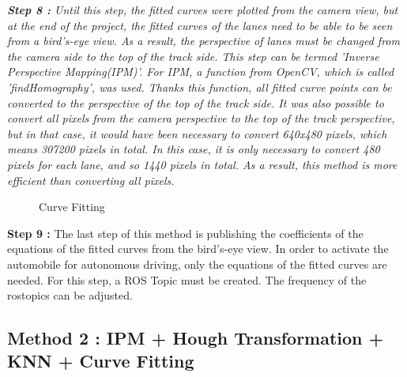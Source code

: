  
\emph{\color{green}\textbf{Step 8 : }Until this step, the fitted curves were plotted from the camera view, but at the end of the project, the fitted curves of the lanes need to be able to be seen from a bird's-eye view. As a result, the perspective of lanes must be changed from the camera side to the top of the track side. This step can be termed 'Inverse Perspective Mapping(IPM)'. For IPM, a function from OpenCV, which is called 'findHomography', was used. Thanks this function, all fitted curve points can be converted to the perspective of the top of the track side. It was also possible to convert all pixels from the camera perspective to the top of the track perspective, but in that case, it would have been necessary to convert 640x480 pixels, which means 307200 pixels in total. In this case, it is only necessary to convert 480 pixels for each lane, and so 1440 pixels in total. As a result, this method is more efficient than converting all pixels.}
 	 		 	
\begin{figure}[H]
  \centering
  \caption{Curve Fitting}
\end{figure} 


\textbf{Step 9 : }The last step of this method is publishing the coefficients of the equations of the fitted curves from the bird's-eye view. In order to activate the automobile for autonomous driving, only the equations of the fitted curves are needed. For this step, a ROS Topic must be created. The frequency of the rostopics can be adjusted.

%

\subsection{Method 2 : IPM + Hough Transformation + KNN + Curve Fitting}\label{sec:Case 2}

